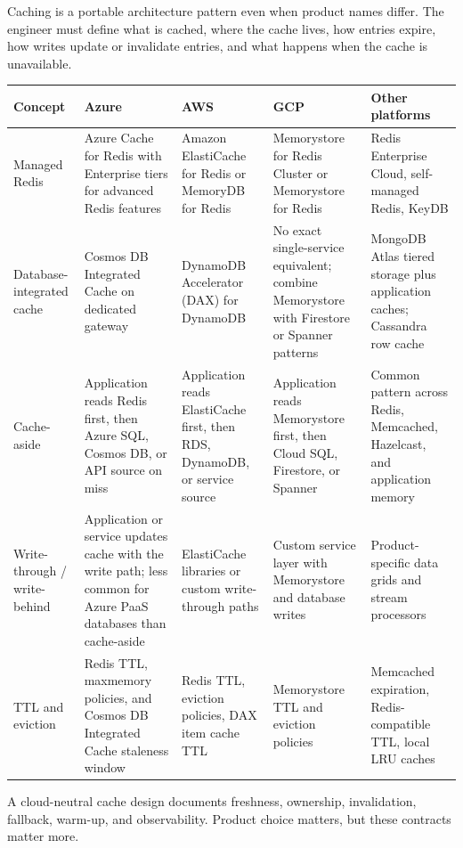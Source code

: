 \begin{crosscloud}
Caching is a portable architecture pattern even when product names differ. The engineer must define what is cached, where the cache lives, how entries expire, how writes update or invalidate entries, and what happens when the cache is unavailable.

\vspace{2mm}
{\footnotesize
\begin{tabular}{@{}p{2.5cm}p{2.9cm}p{2.8cm}p{2.6cm}p{3.2cm}@{}}
\toprule
\textbf{Concept} & \textbf{Azure} & \textbf{AWS} & \textbf{GCP} & \textbf{Other platforms} \\
\midrule
Managed Redis & Azure Cache for Redis with Enterprise tiers for advanced Redis features & Amazon ElastiCache for Redis or MemoryDB for Redis & Memorystore for Redis Cluster or Memorystore for Redis & Redis Enterprise Cloud, self-managed Redis, KeyDB \\
Database-integrated cache & Cosmos DB Integrated Cache on dedicated gateway & DynamoDB Accelerator (DAX) for DynamoDB & No exact single-service equivalent; combine Memorystore with Firestore or Spanner patterns & MongoDB Atlas tiered storage plus application caches; Cassandra row cache \\
Cache-aside & Application reads Redis first, then Azure SQL, Cosmos DB, or API source on miss & Application reads ElastiCache first, then RDS, DynamoDB, or service source & Application reads Memorystore first, then Cloud SQL, Firestore, or Spanner & Common pattern across Redis, Memcached, Hazelcast, and application memory \\
Write-through / write-behind & Application or service updates cache with the write path; less common for Azure PaaS databases than cache-aside & ElastiCache libraries or custom write-through paths & Custom service layer with Memorystore and database writes & Product-specific data grids and stream processors \\
TTL and eviction & Redis TTL, maxmemory policies, and Cosmos DB Integrated Cache staleness window & Redis TTL, eviction policies, DAX item cache TTL & Memorystore TTL and eviction policies & Memcached expiration, Redis-compatible TTL, local LRU caches \\
\bottomrule
\end{tabular}}

\vspace{1mm}
A cloud-neutral cache design documents freshness, ownership, invalidation, fallback, warm-up, and observability. Product choice matters, but these contracts matter more.
\end{crosscloud}

